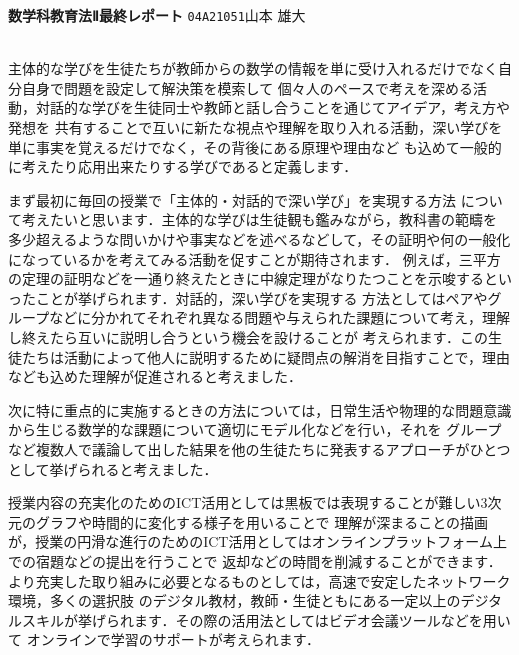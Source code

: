\documentclass{ltjsarticle}
\begin{document}
{\textbf{\LARGE{数学科教育法Ⅱ最終レポート}}}\hspace{\fill} {\texttt{\Large{04A21051}}}{\Large{山本 雄大}}\\\\
\par 
主体的な学びを生徒たちが教師からの数学の情報を単に受け入れるだけでなく自分自身で問題を設定して解決策を模索して
個々人のペースで考えを深める活動，対話的な学びを生徒同士や教師と話し合うことを通じてアイデア，考え方や発想を
共有することで互いに新たな視点や理解を取り入れる活動，深い学びを単に事実を覚えるだけでなく，その背後にある原理や理由など
も込めて一般的に考えたり応用出来たりする学びであると定義します．\par
まず最初に毎回の授業で「主体的・対話的で深い学び」を実現する方法
について考えたいと思います．主体的な学びは生徒観も鑑みながら，教科書の範疇を
多少超えるような問いかけや事実などを述べるなどして，その証明や何の一般化になっているかを考えてみる活動を促すことが期待されます．
例えば，三平方の定理の証明などを一通り終えたときに中線定理がなりたつことを示唆するといったことが挙げられます．対話的，深い学びを実現する
方法としてはペアやグループなどに分かれてそれぞれ異なる問題や与えられた課題について考え，理解し終えたら互いに説明し合うという機会を設けることが
考えられます．この生徒たちは活動によって他人に説明するために疑問点の解消を目指すことで，理由なども込めた理解が促進されると考えました．\par
次に特に重点的に実施するときの方法については，日常生活や物理的な問題意識から生じる数学的な課題について適切にモデル化などを行い，それを
グループなど複数人で議論して出した結果を他の生徒たちに発表するアプローチがひとつとして挙げられると考えました．\par
授業内容の充実化のためのICT活用としては黒板では表現することが難しい3次元のグラフや時間的に変化する様子を用いることで
理解が深まることの描画が，授業の円滑な進行のためのICT活用としてはオンラインプラットフォーム上での宿題などの提出を行うことで
返却などの時間を削減することができます．より充実した取り組みに必要となるものとしては，高速で安定したネットワーク環境，多くの選択肢
のデジタル教材，教師・生徒ともにある一定以上のデジタルスキルが挙げられます．その際の活用法としてはビデオ会議ツールなどを用いて
オンラインで学習のサポートが考えられます．
\end{document}
